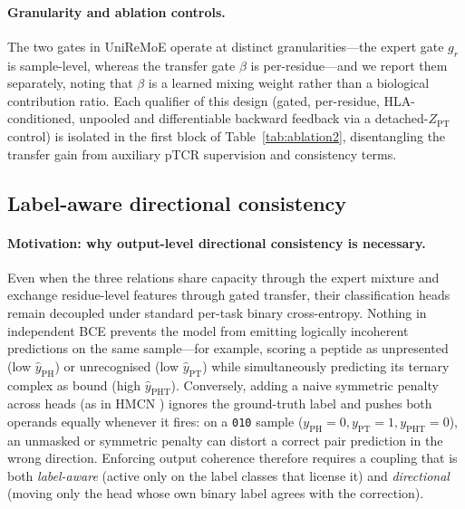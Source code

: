 \documentclass[webpdf,modern,large,namedate]{oup-authoring-template}
\theoremstyle{thmstyleone}
\theoremstyle{thmstyletwo}
\theoremstyle{thmstylethree}
\newcommand{\method}{UniReMoE}
\newcommand{\PT}{pTCR}
\newcommand{\PHm}{\mathrm{PH}}
\newcommand{\PTm}{\mathrm{PT}}
\newcommand{\PHTm}{\mathrm{PHT}}
\begin{document}
\paragraph{Granularity and ablation controls.}
The two gates in \method{} operate at distinct granularities---the expert gate
$g_r$ is sample-level, whereas the transfer gate $\beta$ is per-residue---and
we report them separately, noting that $\beta$ is a learned mixing weight
rather than a biological contribution ratio. Each qualifier of this design
(gated, per-residue, HLA-conditioned, unpooled and differentiable backward
feedback via a detached-$Z_{\PTm}$ control) is isolated in the first block of
Table~\ref{tab:ablation2}, disentangling the transfer gain from auxiliary \PT{}
supervision and consistency terms.

\subsection{Label-aware directional consistency}\label{sec:method:consistency}

\paragraph{Motivation: why output-level directional consistency is necessary.}
Even when the three relations share capacity through the expert mixture and
exchange residue-level features through gated transfer, their classification
heads remain decoupled under standard per-task binary cross-entropy. Nothing in
independent BCE prevents the model from emitting logically incoherent
predictions on the same sample---for example, scoring a peptide as unpresented
(low $\hat y_{\PHm}$) or unrecognised (low $\hat y_{\PTm}$) while
simultaneously predicting its ternary complex as bound (high $\hat y_{\PHTm}$).
Conversely, adding a naive symmetric penalty across heads (as in HMCN
\citep{wehrmann2018hmcn}) ignores the ground-truth label and pushes both
operands equally whenever it fires: on a \texttt{010} sample ($y_{\PHm}=0,
y_{\PTm}=1, y_{\PHTm}=0$), an unmasked or symmetric penalty can distort a
correct pair prediction in the wrong direction. Enforcing output coherence
therefore requires a coupling that is both \emph{label-aware} (active only on
the label classes that license it) and \emph{directional} (moving only the head
whose own binary label agrees with the correction).
\end{document}
